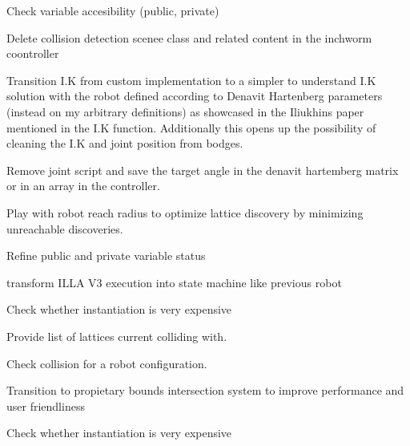 
\begin{DoxyRefList}
\item[Class \mbox{\hyperlink{class_illa_controller_v3}{Illa\+Controller\+V3}} ]\label{todo__todo000001}%
%
Check variable accesibility (public, private) 



Delete collision detection scenee class and related content in the inchworm coontroller 



Transition I.\+K from custom implementation to a simpler to understand I.\+K solution with the robot defined according to Denavit Hartenberg parameters (instead on my arbitrary definitions) as showcased in the Iliukhin\textquotesingle{}s paper mentioned in the I.\+K function. Additionally this opens up the possibility of cleaning the I.\+K and joint position from bodges. 



Remove joint script and save the target angle in the denavit hartemberg matrix or in an array in the controller. 



Play with robot reach radius to optimize lattice discovery by minimizing unreachable discoveries. 



Refine public and private variable status 



transform ILLA V3 execution into state machine like previous robot 
\item[Member \mbox{\hyperlink{class_illa_controller_v3_a8cf1cf2655a3174e928f8b3f161a4b2f}{Illa\+Controller\+V3.Is\+Pose\+Colliding}} (\mbox{\hyperlink{class_pos_j}{PosJ}} Pose\+To\+Check)]\label{todo__todo000002}%
%
Check whether instantiation is very expensive

\label{todo__todo000003}%
%
Provide list of lattices current colliding with.

\label{todo__todo000004}%
%
Check collision for a robot configuration.  
\item[Class \mbox{\hyperlink{class_illa_node_sensor_script}{Illa\+Node\+Sensor\+Script}} ]\label{todo__todo000006}%
%
Transition to propietary bounds intersection system to improve performance and user friendliness  
\item[Member \mbox{\hyperlink{class_inchworm_robot_controller_a434da4643498bd898d99a63678492ae4}{Inchworm\+Robot\+Controller.Is\+Pose\+Colliding}} (\mbox{\hyperlink{class_pos_j}{PosJ}} Pose\+To\+Check)]\label{todo__todo000007}%
%
Check whether instantiation is very expensive


\end{DoxyRefList}
